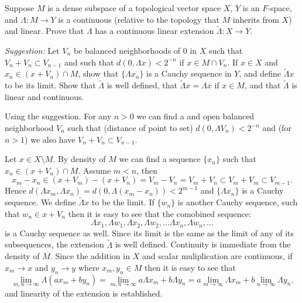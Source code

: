 \begin{enumerate}
\begin{excopy}
Suppose $M$ is a dense subspace of a topological vector space $X$,
$Y$ is an $F$-space, and \(\Lambda:M\rightarrow Y\) is a continuous
(relative to the topology that $M$ inherits from $X$) and linear.
Prove that \(\Lambda\) has a continuous linear extension 
\(\tilde{\Lambda}: X\rightarrow Y\).

\qquad \emph{Suggestion:} Let \(V_n\) be balanced neighborhoods of $0$ in $X$
such that \(V_n + V_n \subset V_{n-1}\) and such that 
\(d(0,\Lambda x) < 2^{-n}\) if \(x\in M\cap V_n\).
If \(x\in X\) and \(x_n \in (x+V_n)\cap M\), show that
\(\{\Lambda x_n\}\) is a Cauchy  sequence in $Y$, 
and define 
\(\tilde{\Lambda} x\) to be its limit.
Show that \(\tilde\Lambda\) is well defined, that 
\(\tilde{\Lambda} x = \Lambda x\) if \(x\in M\), and that \(\tilde\Lambda\)
is linear and continuous.
\end{excopy}

Using the suggestion. 
For any \(n > 0\) we can find a and open balanced  neighborhood \(V_n\)
such that (distance of point to set) \(d(0,\Lambda V_n) < 2^{-n}\)
and (for \(n>1\)) we also have \(V_n + V_n \subset V_{n-1}\).

Let \(x\in X\setminus M\). By density of $M$
we can find a sequence \(\{x_n\}\) such that
\(x_n \in (x+V_n)\cap M\). 
Assume \(m<n\), then 
\begin{equation*}
x_m - x_n \in (x + V_m) - (x + V_n) = V_m - V_n = V_m + V_n
 \subset V_m + V_m \subset V_{m-1}.
\end{equation*}
Hence \(d(\Lambda x_m, \Lambda x_n) = d(0, \Lambda (x_m - x_n)) < 2^{m-1}\)
and \(\{\Lambda x_n\}\) is a Cauchy sequence.
We define \(\tilde{\Lambda}x\) to be the limit. 
If \(\{w_n\}\) is another Cauchy sequence, such that \(w_n\in x+V_n\)
then it is easy to see that the comobined sequence:
\begin{equation*}
 \Lambda x_1, \Lambda w_1, \Lambda x_2, \Lambda w_2, \ldots 
 \Lambda x_n, \Lambda w_n, \ldots
\end{equation*}
is a Cauchy sequence as well. Since its limit is the same as the limit
of any of its subsequences, the extension \(\tilde{\Lambda}\) is well defined.
Continuity is immediate from the density of $M$.
Since the addition in $X$ and scalar muliplication are continuous,
if \(x_m\rightarrow x\) and \(y_n \rightarrow y\) 
where \(x_m,y_n\in M\) then
it is easy to see that 
\begin{equation*}
\lim_{m,n\rightarrow \infty} \Lambda(ax_m + by_n) 
= \lim_{m,n\rightarrow \infty} a\Lambda x_m + b \Lambda y_n
= a \lim_{m\rightarrow \infty} \Lambda x_m + 
  b \lim_{n\rightarrow \infty} \Lambda y_n.
\end{equation*}
and linearity of the extension is established.
 


\end{enumerate}
